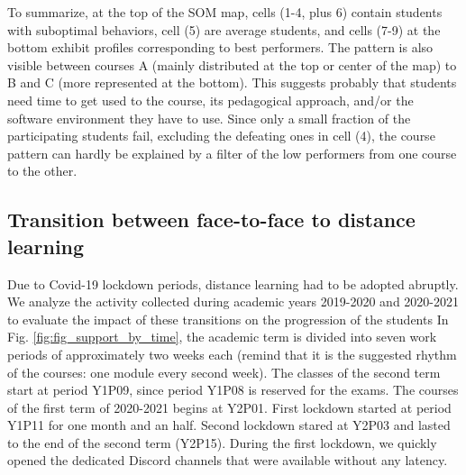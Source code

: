 \documentclass{aims}
\theoremstyle{definition}
\begin{document}
To summarize, at the top of the SOM map, cells (1-4, plus 6) contain
students with suboptimal behaviors, cell (5) are average students, and
cells (7-9) at the bottom exhibit profiles corresponding to best
performers. The pattern is also visible between courses A (mainly
distributed at the top or center of the map) to B and C (more
represented at the bottom). This suggests probably that students need
time to get used to the course, its pedagogical approach, and/or the
software environment they have to use. Since only a small fraction of
the participating students fail, excluding the defeating ones in cell
(4), the course pattern can hardly be explained by a filter of the low
performers from one course to the other.

\hypertarget{transition-between-face-to-face-to-distance-learning}{%
\subsection{Transition between face-to-face to distance
learning}\label{transition-between-face-to-face-to-distance-learning}}

Due to Covid-19 lockdown periods, distance learning had to be adopted
abruptly. We analyze the activity collected during academic years
2019-2020 and 2020-2021 to evaluate the impact of these transitions on
the progression of the students In Fig. \ref {fig:fig_support_by_time},
the academic term is divided into seven work periods of approximately
two weeks each (remind that it is the suggested rhythm of the courses:
one module every second week). The classes of the second term start at
period Y1P09, since period Y1P08 is reserved for the exams. The courses
of the first term of 2020-2021 begins at Y2P01. First lockdown started
at period Y1P11 for one month and an half. Second lockdown stared at
Y2P03 and lasted to the end of the second term (Y2P15). During the first
lockdown, we quickly opened the dedicated Discord channels that were
available without any latency.
\end{document}
